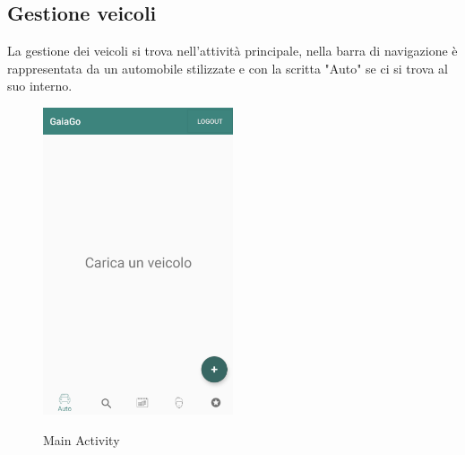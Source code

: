 \subsection{Gestione veicoli}
La gestione dei veicoli si trova nell'attività principale, nella barra di navigazione è rappresentata da un automobile stilizzate e con la scritta "Auto" se ci si trova al suo interno.
 \begin{figure}[H] 
	\centering 
	\includegraphics[width=0.5\textwidth]{res/images/main_activity_vuota.png}\\
	\caption{Main Activity}
	\label{main}
\end{figure}
\pagebreak
